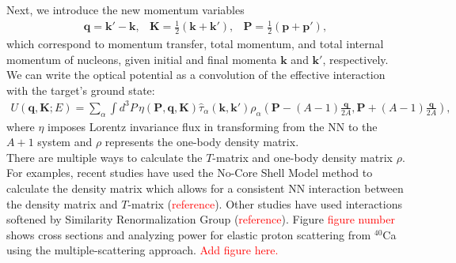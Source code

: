 \documentclass[preprintnumbers,floatfix,aps,prc,preprint,nofootinbib]{revtex4-1}
\begin{document}
Next, we introduce the new momentum variables
%
\begin{subequations}
	\label{eq:momenta}
	\begin{eqnarray}
		\label{eq:momentum_transfer}
		\textbf{q} = \textbf{k}' - \textbf{k},
	\end{eqnarray}
	\begin{eqnarray}
		\label{eq:total_momentum}
		\textbf{K} = \frac{1}{2} ( \textbf{k} + \textbf{k}' ),
	\end{eqnarray}
	\begin{eqnarray}
		\label{eq:internal_momentum}
		\textbf{P} = \frac{1}{2} ( \textbf{p} + \textbf{p}' ),
	\end{eqnarray}
\end{subequations}
%
which correspond to momentum transfer, total momentum, and total internal momentum of nucleons, given initial and final momenta $\textbf{k}$ and $\textbf{k}'$, respectively. We can write the optical potential as a convolution of the effective interaction with the target's ground state:
%
\begin{eqnarray}
	\label{eq:ms_optical_potential}
	U(\textbf{q}, \textbf{K}; E) = \sum_{\alpha} \int d^3 P \, \eta(\textbf{P}, \textbf{q}, \textbf{K}) \hat{\tau}_{\alpha}(\textbf{k}, \textbf{k}') \rho_{\alpha}(\textbf{P} - (A-1) \frac{\textbf{q}}{2 A}, \textbf{P} + (A-1) \frac{\textbf{q}}{2 A}),
\end{eqnarray}
%
where $\eta$ imposes Lorentz invariance flux in transforming from the NN to the $A+1$ system and $\rho$ represents the one-body density matrix.
\\

There are multiple ways to calculate the $T$-matrix and one-body density matrix $\rho$. For examples, recent studies have used the No-Core Shell Model method to calculate the density matrix which allows for a consistent NN interaction between the density matrix and $T$-matrix (\textcolor{red}{reference}). Other studies have used interactions softened by Similarity Renormalization Group (\textcolor{red}{reference}). Figure \textcolor{red}{figure number} shows cross sections and analyzing power for elastic proton scattering from $^{40}$Ca using the multiple-scattering approach. \textcolor{red}{Add figure here.}
\\
		
	
\end{document}
